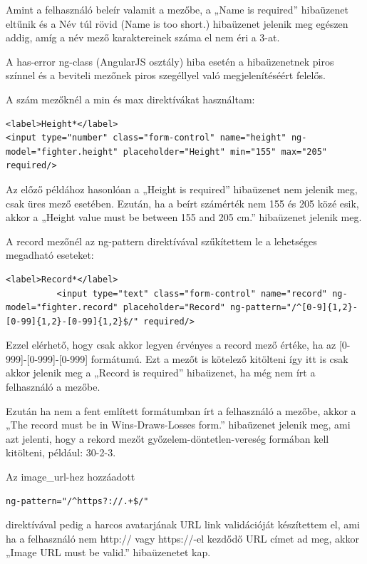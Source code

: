 Amint a felhasználó beleír valamit a mezőbe, a „Name is required” hibaüzenet eltűnik és a Név túl rövid (Name is too short.) hibaüzenet jelenik meg egészen addig, amíg a név mező karaktereinek száma el nem éri a 3-at.

A has-error ng-class (AngularJS osztály) hiba esetén a hibaüzenetnek piros színnel és a beviteli mezőnek piros szegéllyel való megjelenítéséért felelős.

A szám mezőknél a min és max direktívákat használtam:

\begin{verbatim}
<label>Height*</label>
<input type="number" class="form-control" name="height" ng-model="fighter.height" placeholder="Height" min="155" max="205" required/>
\end{verbatim}

Az előző példához hasonlóan a „Height is required” hibaüzenet nem jelenik meg, csak üres mező esetében. Ezután, ha a beírt számérték nem 155 és 205 közé esik, akkor a 
„Height value must be between 155 and 205 cm.” hibaüzenet jelenik meg.

A record mezőnél az ng-pattern direktívával szűkítettem le a lehetséges megadható eseteket:

\begin{verbatim}
<label>Record*</label>
          <input type="text" class="form-control" name="record" ng-model="fighter.record" placeholder="Record" ng-pattern="/^[0-9]{1,2}-[0-99]{1,2}-[0-99]{1,2}$/" required/>
\end{verbatim}

Ezzel elérhető, hogy csak akkor legyen érvényes a record mező értéke, ha az [0-999]-[0-999]-[0-999] formátumú. Ezt a mezőt is kötelező kitölteni így itt is csak akkor jelenik meg a „Record is required” hibaüzenet, ha még nem írt a felhasználó a mezőbe.

Ezután ha nem a fent említett formátumban írt a felhasználó a mezőbe, akkor a „The record must be in Wins-Draws-Losses form.” hibaüzenet jelenik meg, ami azt jelenti, hogy a rekord mezőt győzelem-döntetlen-vereség formában kell kitölteni, például: 30-2-3.

Az image\_url-hez hozzáadott
\begin{verbatim}
ng-pattern="/^https?://.+$/"
\end{verbatim}
direktívával pedig a harcos avatarjának URL link validációját készítettem el, ami ha a felhasználó nem http:// vagy https://-el kezdődő URL címet ad meg, akkor „Image URL must be valid.” hibaüzenetet kap.

